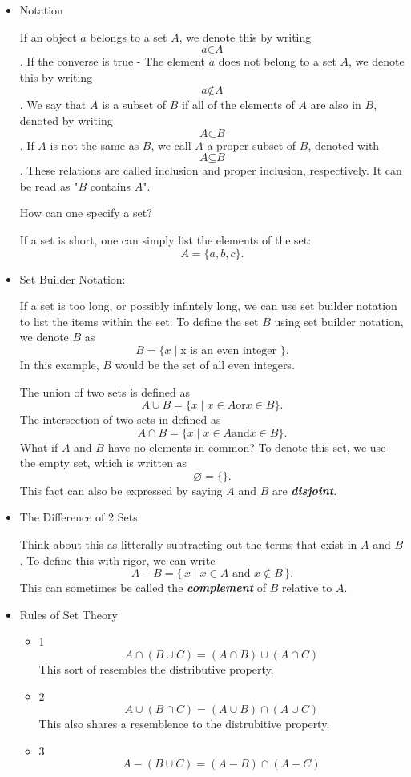 \documentclass[a4paper]{report}
\begin{document}
\begin{itemize}

\item Notation

	If an object $\textit{a}$ belongs to a set $\textit{A}$, we denote this by writing 
		$$\textit{a}\in \textit{A}$$.
	If the converse is true - The element $\textit{a}$ does not belong to a set $\textit{A}$, we denote this by writing 
		$$\textit{a}\notin \textit{A}$$.
	We say that $\textit{A}$ is a subset of $\textit{B}$ if all of the elements of $\textit{A}$ are also in $\textit{B}$, denoted by writing
		$$\textit{A}\subset\textit{B}$$.
	If $\textit{A}$ is not the same as $\textit{B}$, we call  $\textit{A}$ a proper subset of $\textit{B}$, denoted with 
		$$\textit{A}\subseteq\textit{B}$$.
	These relations are called inclusion and proper inclusion, respectively. It can be read as "$B$ contains $A$". 
 
	How can one specify a set?

	If a set is short, one can simply list the elements of the set:
		$$\textit{A} = \{a, b, c \}. $$
\item Set Builder Notation:

If a set is too long, or possibly infintely long, we can use set builder notation to list the items within the set. To define the set $B$ using set builder notation, we denote $B$ as 
		$$ \textit{B} = \{ x \mid \text{x is an even integer }\}. $$ 
In this example, $B$ would be the set of all even integers. 

The union of two sets is defined as 
		$$ \textit{A}\cup\textit{B} = \{x \mid x \in A \text{or} x \in B\}. $$
The intersection of two sets in defined as 
		$$ \textit{A}\cap\textit{B} = \{x \mid x \in A \text{and} x \in B\}. $$
What if $A$ and $B$ have no elements in common? To denote this set, we use the empty set, which is written as 
		$$ \varnothing = \{ \}. $$
This fact can also be expressed by saying $A$ and $B$ are \textit{\textbf{disjoint}}.
		
\item 
	The Difference of 2 Sets

	Think about this as litterally subtracting out the terms that exist in $A$ and $B$. To define this with rigor, we can write
			$$A - B = \{\, x \mid x \in A \text{ and } x \notin B \,\}.$$
	This can sometimes be called the \textit{\textbf{complement}} of $B$ relative to $A$.
\item Rules of Set Theory
	\begin{itemize}
		\item 1
			$$A\cap \left( B \cup C \right) = \left( A \cap B \right) \cup \left( A \cap C \right) $$
			This sort of resembles the distributive property. 
		\item 2 
			$$A\cup \left( B \cap C \right) = \left( A \cup B \right) \cap \left( A \cup C \right) $$
			This also shares a resemblence to the distrubitive property. 
		\item 3	$$A - \left( B \cup C \right) = \left( A - B \right) \cap \left( A - C \right) $$
 

\end{itemize}
\end{itemize}
\end{document}
